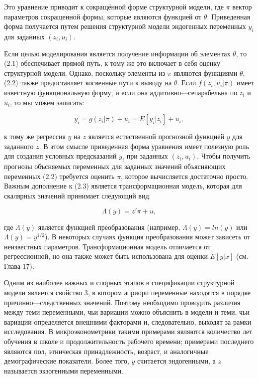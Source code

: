 	Это уравнение приводит к сокращённой форме структурной модели, где $\pi$ вектор параметров сокращенной формы, которые являются функцией от $\theta$. Приведенная форма получается путем решения структурной модели эндогенных переменных $y_{i}$ для заданных $(z_{i},u_{i})$. 


	Если целью моделирования является получение информации об элементах $\theta$, то (2.1) обеспечивает прямой путь, к тому же это включает в себя оценку структурной модели. Однако, поскольку элементы из $\pi$ являются функциями $\theta$, (2.2) также предоставляет косвенные пути к выводу на $\theta$. Если $f(z_{i},u_{i}|\pi)$ имеет известную функциональную форму, и если она аддитивно---сепарабельна по $z_{i}$ и $u_{i}$, то мы можем записать:
	
	
	
\begin{equation}
y_{i}=g(z_{i}|\pi)+u_{i}=E[y_{i}|z_{i}]+u_{i},
\end{equation}

к тому же регрессия $y$ на $z$ является естественной прогнозной функцией $y$ для заданного $z$. В этом смысле приведенная форма уравнения имеет полезную роль для создания условных предсказаний $y_{i}$ при заданных $(z_{i},u_{i})$. Чтобы получить прогнозы объсняемых переменных для заданных значений объясняющих переменных (2.2) требуется оценить $\pi$, которое вычисляется достаточно просто.
	Важным дополнение к (2.3) является трансформационная модель, которая для скалярных значений принимает следующий вид:
	
\begin{equation}
\Lambda(y)=z'\pi+u,
\end{equation}

где $\Lambda(y) $ является функцией преобразования (например,  $\Lambda(y)=ln(y)$ или $\Lambda(y)=y^{1/2}$). В некоторых случаях функция преобразования может зависеть от неизвестных параметров. Трансформационная модель отличается от регрессионной, но она также может быть использована для оценки $E[y|x]$ (см. Глава 17). 


	Одним из наиболее важных и спорных этапов в спецификации структурной модели является свойство 3, в котором априори переменные находятся в порядке причинно---следственных значений. Поэтому необходимо проводить различия между теми переменными, чьи вариации можно объяснить в модели и теми, чьи вариации определяется внешними факторами и, следовательно, выходят за рамки исследования. В микроэконометрики такими примерами являются количество лет обучения в школе и продолжительность рабочего времени; примерами последнего являются пол, этническая принадлежность, возраст, и аналогичные демографические показатели. Более того, $y$ считается эндогенными, а $z$ называется экзогенными переменными. 
	
